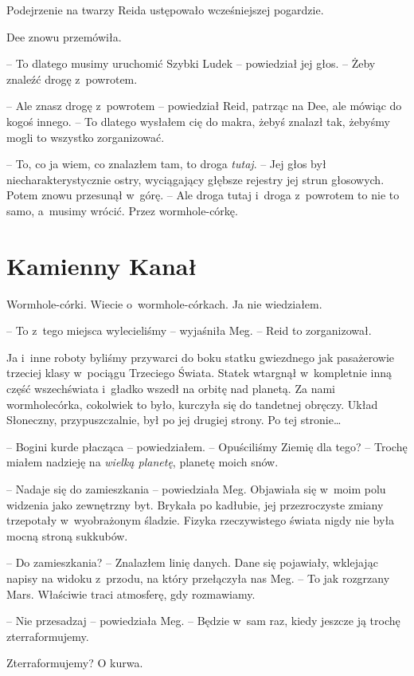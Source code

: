 \documentclass[oneside,polish,11pt,sfheadings]{mwbk}
\begin{document}
Podejrzenie na twarzy Reida ustępowało wcześniejszej pogardzie.

Dee znowu przemówiła. 

-- To dlatego musimy uruchomić Szybki Ludek -- powiedział jej głos. -- Żeby znaleźć drogę z~powrotem.

-- Ale znasz drogę z~powrotem -- powiedział Reid, patrząc na Dee, ale
mówiąc do kogoś innego. -- To dlatego wysłałem cię do makra, żebyś
znalazł tak, żebyśmy mogli to wszystko zorganizować.

-- To, co ja wiem, co znalazłem tam, to droga \emph{tutaj}. -- Jej głos
był niecharakterystycznie ostry, wyciągający głębsze rejestry jej strun
głosowych. Potem znowu przesunął w~górę. -- Ale droga tutaj i~droga z~powrotem to nie to samo, a~musimy wrócić. Przez wormhole-córkę.

\chapter{Kamienny Kanał}

Wormhole-córki. Wiecie o~wormhole-córkach. Ja nie wiedziałem.

-- To z~tego miejsca wylecieliśmy -- wyjaśniła Meg. -- Reid to
zorganizował.

Ja i~inne roboty byliśmy przywarci do boku statku gwiezdnego jak
pasażerowie trzeciej klasy w~pociągu Trzeciego Świata. Statek wtargnął w~kompletnie inną część wszechświata i~gładko wszedł na orbitę nad
planetą. Za nami worm\-ho\-le\dywiz córka, cokolwiek to było, kurczyła się do
tandetnej obręczy. Układ Słoneczny, przypuszczalnie, był po jej drugiej
strony. Po tej stronie\ldots

-- Bogini kurde płacząca -- powiedziałem. -- Opuściliśmy Ziemię dla tego? -- Trochę miałem nadzieję na \emph{wielką planetę}, planetę moich snów.

-- Nadaje się do zamieszkania -- powiedziała Meg. Objawiała się w~moim
polu widzenia jako zewnętrzny byt. Brykała po kadłubie, jej
przezroczyste zmiany trzepotały w~wyobrażonym śladzie. Fizyka
rzeczywistego świata nigdy nie była mocną stroną sukkubów.

-- Do zamieszkania? -- Znalazłem linię danych. Dane się pojawiały,
wklejając napisy na widoku z~przodu, na który przełączyła nas Meg. -- To
jak rozgrzany Mars. Właściwie traci atmosferę, gdy rozmawiamy.

-- Nie przesadzaj -- powiedziała Meg. -- Będzie w~sam raz, kiedy jeszcze ją
trochę zterraformujemy.

Zterraformujemy? O kurwa.
\end{document}
